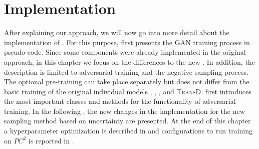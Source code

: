 \chapter{Implementation}
\label{ch:implementation}
%
After explaining our approach, we will now go into more detail about the implementation of \usgan.
For this purpose,  first presents the \ac{GAN} training process in pseudo-code.
Since some components were already implemented in the original \kbgan approach, in this chapter we focus on the differences to the new \usgan.
In addition, the description is limited to adversarial training and the negative sampling process.
The optional pre-training can take place separately but does not differ from the basic training of the original individual models \distmult, \complex, \transe, and \textsc{TransD}.
 first introduces the most important classes and methods for the functionality of adversarial training.
In the following , the new changes in the implementation for the new sampling method based on uncertainty are presented.
At the end of this chapter a hyperparameter optimization is described in  and configurations to run training on $PC^2$ is reported in .









